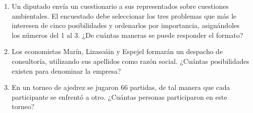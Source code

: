 \begin{Ejer}
\begin{enumerate}
\item Un diputado env\'ia un cuestionario a sus representados sobre cuestiones ambientales. El encuestado debe seleccionar los tres problemas que m\'as le interesen de cinco posibilidades y ordenarlos por importancia, asign\'andoles los n\'umeros del 1 al 3. ¿De cu\'antas maneras se puede responder el formato?

\item Los economistas Mar\'in, Lizaso\'ain y Espejel formar\'an un despacho de consultor\'ia, utilizando sus apellidos como raz\'on social. ¿Cu\'antas posibilidades existen para denominar la empresa?

\item En un torneo de ajedrez se jugaron 66 partidas, de tal manera que cada participante se enfrent\'o a otro. ¿Cu\'antas personas participaron en este torneo?
\end{enumerate}
\end{Ejer}


